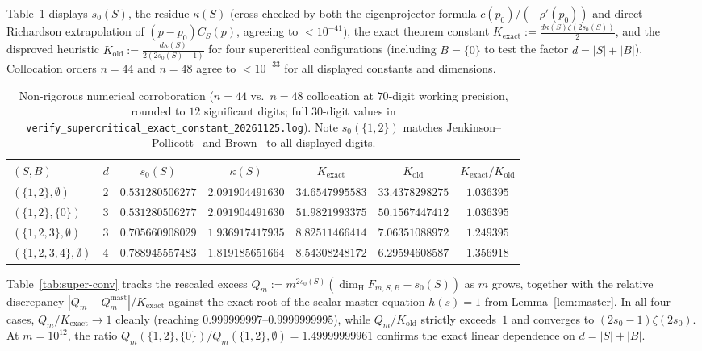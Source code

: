 \documentclass[11pt]{article}
\theoremstyle{definition}
\theoremstyle{remark}
\newcommand{\dimH}{\dim_{\mathrm{H}}}
\begin{document}
Table~\ref{tab:super-constants} displays $s_0(S)$, the residue $\kappa(S)$
(cross-checked by both the eigenprojector formula $c(p_0)/(-\rho'(p_0))$ and
direct Richardson extrapolation of $(p-p_0)C_S(p)$, agreeing to $<10^{-41}$),
the exact theorem constant $K_{\mathrm{exact}}:=\frac{d\kappa(S)\zeta(2s_0(S))}{2}$,
and the disproved heuristic $K_{\mathrm{old}}:=\frac{d\kappa(S)}{2(2s_0(S)-1)}$
for four supercritical configurations (including $B=\{0\}$ to test the factor
$d=|S|+|B|$). Collocation orders $n=44$ and $n=48$ agree to $<10^{-33}$ for
all displayed constants and dimensions.

\begin{table}[ht]
\centering\small\setlength{\tabcolsep}{4.5pt}
\begin{tabular}{@{}lcccccc@{}}
\toprule
$(S,B)$ & $d$ & $s_0(S)$ & $\kappa(S)$ & $K_{\mathrm{exact}}$ & $K_{\mathrm{old}}$ & $K_{\mathrm{exact}}/K_{\mathrm{old}}$ \\
\midrule
$(\{1,2\},\emptyset)$ & $2$ & $0.531280506277$ & $2.091904491630$ & $34.6547995583$ & $33.4378298275$ & $1.036395$ \\
$(\{1,2\},\{0\})$ & $3$ & $0.531280506277$ & $2.091904491630$ & $51.9821993375$ & $50.1567447412$ & $1.036395$ \\
$(\{1,2,3\},\emptyset)$ & $3$ & $0.705660908029$ & $1.936917417935$ & $8.82511466414$ & $7.06351088972$ & $1.249395$ \\
$(\{1,2,3,4\},\emptyset)$ & $4$ & $0.788945557483$ & $1.819185651664$ & $8.54308248172$ & $6.29594608587$ & $1.356918$ \\
\bottomrule
\end{tabular}
\caption{Non-rigorous numerical corroboration ($n=44$ vs.\ $n=48$ collocation
at $70$-digit working precision, rounded to $12$ significant digits; full
$30$-digit values in \texttt{verify\_\allowbreak supercritical\_\allowbreak exact\_\allowbreak constant\_\allowbreak 20261125.log}).
Note $s_0(\{1,2\})$ matches Jenkinson--Pollicott~\cite{JP2018} and
Brown~\cite{Brown2026} to all displayed digits.}\label{tab:super-constants}
\end{table}

Table~\ref{tab:super-conv} tracks the rescaled excess
$Q_m:=m^{2s_0(S)}(\dimH F_{m,S,B}-s_0(S))$ as $m$ grows, together with the
relative discrepancy $|Q_m-Q_m^{\mathrm{mast}}|/K_{\mathrm{exact}}$ against
the exact root of the scalar master equation $h(s)=1$ from
Lemma~\ref{lem:master}. In all four cases, $Q_m/K_{\mathrm{exact}}\to1$
cleanly (reaching $0.999999997$--$0.9999999995$), while $Q_m/K_{\mathrm{old}}$
strictly exceeds~$1$ and converges to $(2s_0-1)\zeta(2s_0)$. At $m=10^{12}$,
the ratio $Q_m(\{1,2\},\{0\})/Q_m(\{1,2\},\emptyset)=1.49999999961$ confirms
the exact linear dependence on $d=|S|+|B|$.
\end{document}
